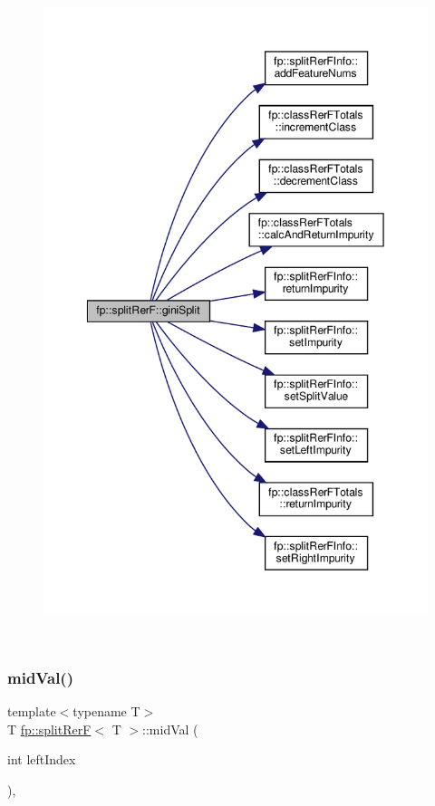 \begin{figure}[H]
\begin{center}
\leavevmode
\includegraphics[height=550pt]{classfp_1_1splitRerF_a5b727300d091166f7a0044162491b1e9_cgraph}
\end{center}
\end{figure}
\mbox{\label{classfp_1_1splitRerF_adf7600843befe65e4a8a34a60f2b5edc}} 
\subsubsection{\texorpdfstring{mid\+Val()}{midVal()}}
{\footnotesize\ttfamily template$<$typename T$>$ \\
T \hyperlink{classfp_1_1splitRerF}{fp\+::split\+RerF}$<$ T $>$\+::mid\+Val (\begin{DoxyParamCaption}\item[{int}]{left\+Index }\end{DoxyParamCaption})\hspace{0.3cm}{\ttfamily [inline]}, {\ttfamily [protected]}}



